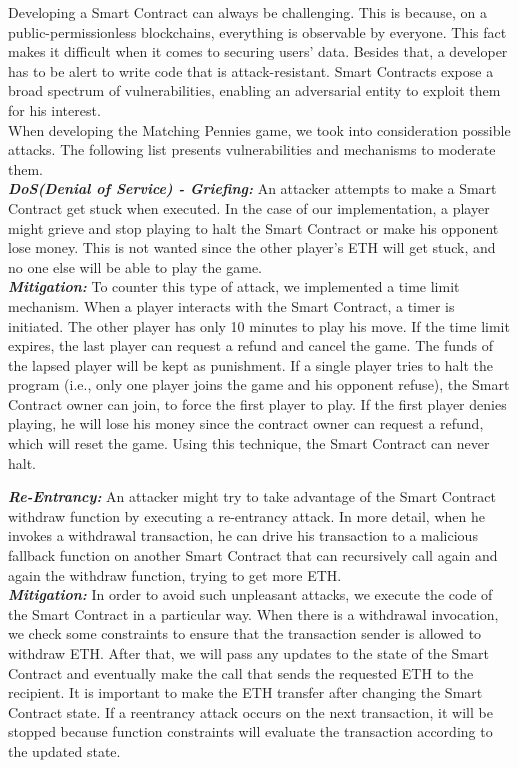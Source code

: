 \documentclass[12pt,a4paper]{article}
\begin{document}
Developing a Smart Contract can always be challenging. This is because, on a public-permissionless blockchains, everything is observable by everyone. This fact makes it difficult when it comes to securing users’ data. Besides that, a developer has to be alert to write code that is attack-resistant. Smart Contracts expose a broad spectrum of vulnerabilities, enabling an adversarial entity to exploit them for his interest.\\

When developing the Matching Pennies game, we took into consideration possible attacks.
The following list presents vulnerabilities and mechanisms to moderate them. \\

\textbf{\emph{DoS(Denial of Service) - Griefing: }}An attacker attempts to make a Smart Contract get stuck when executed. In the case of our implementation, a player might grieve and stop playing to halt the Smart Contract or make his opponent lose money. This is not wanted since the other player’s ETH will get stuck, and no one else will be able to play the game. \\

\textbf{\emph{Mitigation: }}To counter this type of attack, we implemented a time limit mechanism. When a player interacts with the Smart Contract, a timer is initiated. The other player has only 10 minutes to play his move. If the time limit expires, the last player can request a refund and cancel the game. The funds of the lapsed player will be kept as punishment. If a single player tries to halt the program (i.e., only one player joins the game and his opponent refuse), the Smart Contract owner can join, to force the first player to play. If the first player denies playing, he will lose his money since the contract owner can request a refund, which will reset the game. Using this technique, the Smart Contract can never halt.\\

\pagebreak

\textbf{\emph{Re-Entrancy: }}An attacker might try to take advantage of the Smart Contract withdraw function by executing a re-entrancy attack. In more detail, when he invokes a withdrawal transaction, he can drive his transaction to a malicious fallback function on another Smart Contract that can recursively call again and again the withdraw function, trying to get more ETH.\\

\textbf{\emph{Mitigation: }}In order to avoid such unpleasant attacks, we execute the code of the Smart Contract in a particular way. When there is a withdrawal invocation, we check some constraints to ensure that the transaction sender is allowed to withdraw ETH. After that, we will pass any updates to the state of the Smart Contract and eventually make the call that sends the requested ETH to the recipient. It is important to make the ETH transfer after changing the Smart Contract state. If a reentrancy attack occurs on the next transaction, it will be stopped because function constraints will evaluate the transaction according to the updated state.\\
\end{document}
